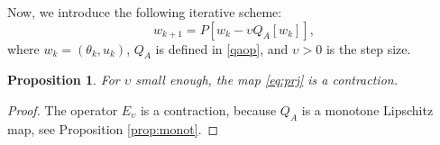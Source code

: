 \documentclass[12pt]{amsart}
\newcommand{\1}{{\chi}}
\newtheorem{pro}{Proposition}
\theoremstyle{definition}
\begin{document}
        Now, we introduce 
        the following iterative scheme:
        \begin{equation}\label{eq:prj}
                w_{k+1} = P\left[w_k - \upsilon  Q_A [w_k]\right],
        \end{equation}
        where $w_k = (\theta_k, u_k)$, $Q_A$ is defined in \eqref{qaop}, and $\upsilon>0$ is the step size. 
       \begin{pro}
       	For $\upsilon$ small enough,
       the map \eqref{eq:prj} is a contraction.
       \end{pro}
       \begin{proof}
       	The operator $E_{\upsilon}$ is a contraction, because $Q_A$ is a monotone Lipschitz map, see Proposition \ref{prop:monot}.
       \end{proof}
\end{document}
